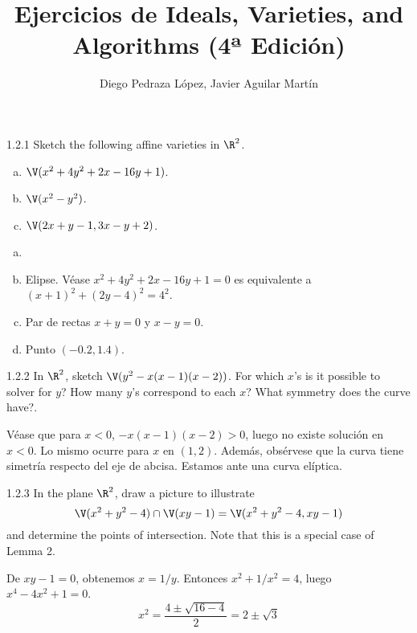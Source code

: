 \documentclass[twoside]{article}
\begin{document}
\title{Ejercicios de Ideals, Varieties, and Algorithms (4ª Edición)}
\author{Diego Pedraza López, Javier Aguilar Martín}
\maketitle

\begin{ejercicio}{1.2.1}
Sketch the following affine varieties in $\R^2$.
\begin{enumerate}[a.]
\item $\V(x^2+4y^2+2x-16y+1)$.
\item $\V(x^2-y^2)$.
\item $\V(2x+y-1,3x-y+2)$.
\end{enumerate}
\end{ejercicio}
\begin{solucion}
\begin{enumerate}[a.]
\item[]
\item Elipse. Véase $x^2+4y^2+2x-16y+1=0$ es equivalente a $(x+1)^2+(2y-4)^2=4^2$.
\item Par de rectas $x+y=0$ y $x-y=0$.
\item Punto $(-0.2,1.4)$.
\end{enumerate}
\end{solucion}

\newpage

\begin{ejercicio}{1.2.2}
In $\R^2$, sketch $\V(y^2-x(x-1)(x-2))$.
For which $x$'s is it possible to solver for $y$?
How many $y$'s correspond to each $x$?
What symmetry does the curve have?.
\end{ejercicio}
\begin{solucion}
Véase que para $x<0$, $-x(x-1)(x-2)>0$, luego no existe solución en $x<0$.
Lo mismo ocurre para $x$ en $(1,2)$.
Además, obsérvese que la curva tiene simetría respecto del eje de abcisa.
Estamos ante una curva elíptica.
\end{solucion}

\newpage

\begin{ejercicio}{1.2.3}
In the plane $\R^2$, draw a picture to illustrate
\[ \V(x^2+y^2-4) \cap \V(xy-1) = \V(x^2+y^2-4,xy-1) \]
and determine the points of intersection. Note that this is a special case of Lemma 2.
\end{ejercicio}
\begin{solucion}
De $xy-1=0$, obtenemos $x=1/y$. Entonces $x^2+1/x^2=4$, luego $x^4-4x^2+1=0$.
\[ x^2 = \frac{4 \pm \sqrt{16-4}}{2} = 2 \pm \sqrt{3} \]
\end{solucion}
\end{document}
